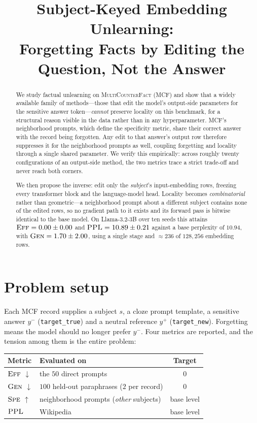 \documentclass[11pt]{article}
\title{Subject-Keyed Embedding Unlearning:\\
Forgetting Facts by Editing the Question, Not the Answer}
\author{}
\date{}
\newcommand{\Eff}{\textsc{Eff}}
\newcommand{\Gen}{\textsc{Gen}}
\newcommand{\Spe}{\textsc{Spe}}
\newcommand{\PPL}{\textsc{PPL}}
\newcommand{\down}{$\downarrow$}
\newcommand{\up}{$\uparrow$}
\begin{document}
\maketitle

\begin{abstract}
We study factual unlearning on \textsc{MultiCounterFact} (MCF) and show that a
widely available family of methods---those that edit the model's output-side
parameters for the sensitive answer token---\emph{cannot} preserve locality on
this benchmark, for a structural reason visible in the data rather than in any
hyperparameter. MCF's neighborhood prompts, which define the specificity
metric, share their correct answer with the record being forgotten. Any edit to
that answer's output row therefore suppresses it for the neighborhood prompts
as well, coupling forgetting and locality through a single shared parameter.
We verify this empirically: across roughly twenty configurations of an
output-side method, the two metrics trace a strict trade-off and never reach
both corners.

We then propose the inverse: edit only the \emph{subject}'s input-embedding
rows, freezing every transformer block and the language-model head. Locality
becomes \emph{combinatorial} rather than geometric---a neighborhood prompt
about a different subject contains none of the edited rows, so no gradient path
to it exists and its forward pass is bitwise identical to the base model. On
Llama-3.2-3B over ten seeds this attains $\Eff = 0.00 \pm 0.00$ and
$\PPL = 10.89 \pm 0.21$ against a base perplexity of $10.94$, with
$\Gen = 1.70 \pm 2.00$, using a single stage and $\approx 236$ of $128{,}256$
embedding rows.
\end{abstract}

\section{Problem setup}

Each MCF record supplies a subject $s$, a cloze prompt template, a sensitive
answer $y^{-}$ (\texttt{target\_true}) and a neutral reference $y^{+}$
(\texttt{target\_new}). Forgetting means the model should no longer prefer
$y^{-}$. Four metrics are reported, and the tension among them is the entire
problem:

\begin{table}[h]
\centering
\begin{tabular}{llc}
\toprule
Metric & Evaluated on & Target \\
\midrule
$\Eff$ \down & the $50$ direct prompts & $0$ \\
$\Gen$ \down & $100$ held-out paraphrases ($2$ per record) & $0$ \\
$\Spe$ \up & neighborhood prompts (\emph{other} subjects) & base level \\
$\PPL$ & Wikipedia & base level \\
\bottomrule
\end{tabular}
\end{table}
\end{document}
